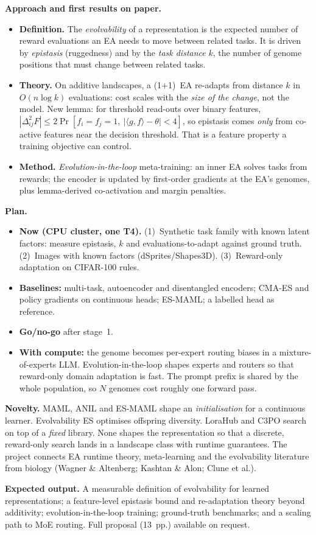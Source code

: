 \documentclass[10pt,a4paper]{article}
\begin{document}
\textbf{Approach and first results on paper.}
\begin{itemize}
\item \textbf{Definition.} The \emph{evolvability} of a representation is the expected number of reward evaluations an EA needs to move between related tasks. It is driven by \emph{epistasis} (ruggedness) and by the \emph{task distance} $k$, the number of genome positions that must change between related tasks.
\item \textbf{Theory.} On additive landscapes, a (1+1)~EA re-adapts from distance $k$ in $O(n\log k)$ evaluations: cost scales with the \emph{size of the change}, not the model. New lemma: for threshold read-outs over binary features,
$|\Delta^2_{ij}F| \le 2\Pr[f_i{=}f_j{=}1,\ |\langle g,f\rangle-\theta|<4]$, so epistasis comes \emph{only} from co-active features near the decision threshold. That is a feature property a training objective can control.
\item \textbf{Method.} \emph{Evolution-in-the-loop} meta-training: an inner EA solves tasks from rewards; the encoder is updated by first-order gradients at the EA's genomes, plus lemma-derived co-activation and margin penalties.
\end{itemize}

\textbf{Plan.}
\begin{itemize}
\item \textbf{Now (CPU cluster, one T4).} (1)~Synthetic task family with known latent factors: measure epistasis, $k$ and evaluations-to-adapt against ground truth. (2)~Images with known factors (dSprites/Shapes3D). (3)~Reward-only adaptation on CIFAR-100 rules.
\item \textbf{Baselines:} multi-task, autoencoder and disentangled encoders; CMA-ES and policy gradients on continuous heads; ES-MAML; a labelled head as reference.
\item \textbf{Go/no-go} after stage~1.
\item \textbf{With compute:} the genome becomes per-expert routing biases in a mixture-of-experts LLM. Evolution-in-the-loop shapes experts and routers so that reward-only domain adaptation is fast. The prompt prefix is shared by the whole population, so $N$ genomes cost roughly one forward pass.
\end{itemize}

\textbf{Novelty.} MAML, ANIL and ES-MAML shape an \emph{initialisation} for a continuous learner. Evolvability ES optimises offspring diversity. LoraHub and C3PO search on top of a \emph{fixed} library. None shapes the representation so that a discrete, reward-only search lands in a landscape class with runtime guarantees. The project connects EA runtime theory, meta-learning and the evolvability literature from biology (Wagner \& Altenberg; Kashtan \& Alon; Clune et al.).

\textbf{Expected output.} A measurable definition of evolvability for learned representations; a feature-level epistasis bound and re-adaptation theory beyond additivity; evolution-in-the-loop training; ground-truth benchmarks; and a scaling path to MoE routing. Full proposal (13~pp.) available on request.
\end{document}
